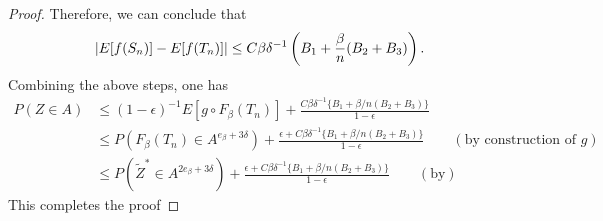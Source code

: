 \documentclass{article}
\begin{document}
\begin{proof}
    Therefore, we can conclude that
    \begin{equation*}
        \abs{E[ f(S_n)] - E[ f(T_n)]} \leq C \beta \delta^{-1} \left(B_1 + \frac{\beta}{n} ( B_2 + B_3)\right).
    \end{equation*}
    Combining the above steps, one has \begin{align*}
        P(Z \in A) &\leq ( 1 - \epsilon)^{-1} E[ g \circ F_\beta ( T_n)] + \frac { C \beta \delta^{-1} \{ B_1 + \beta /n ( B_2 + B_3) \}}{ 1 - \epsilon } \\
        &\leq P( F_ \beta (T_n) \in A^{ e_\beta + 3 \delta }) + \frac { \epsilon + C \beta \delta^{-1} \{ B_1 + \beta /n ( B_2 + B_3) \}}{ 1 - \epsilon }\qquad(\text{by construction of }g)\\
        &\leq P( \tilde{Z}^* \in A^{ 2 e_\beta + 3 \delta}) + \frac {\epsilon + C \beta \delta^{-1} \{ B_1 + \beta /n ( B_2 + B_3) \}}{ 1 - \epsilon } \qquad(\text{by} )
    \end{align*}
    This completes the proof
\end{proof}
    
\end{document}
